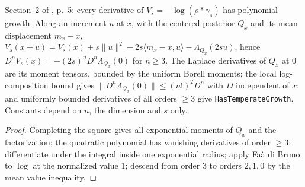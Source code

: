 \begin{lemma}
  \label{lem:bkl-gaussian-growth}
  \leanok
  Section~2 of \cite{BizeulKlartagLehec2026}, p.~5: every derivative of $V_s=-\log(\rho*\gamma_s)$
  has polynomial growth. Along an increment $u$ at $x$, with the centered posterior $Q_x$ and its
  mean displacement $m_x-x$, $V_s(x+u)=V_s(x)+s\|u\|^2-2s\langle m_x-x,u\rangle-\Lambda_{Q_x}(2su)$,
  hence $D^nV_s(x)=-(2s)^nD^n\Lambda_{Q_x}(0)$ for $n\ge3$. The Laplace derivatives of $Q_x$ at $0$
  are its moment tensors, bounded by the uniform Borell moments; the local log-composition bound
  gives $\|D^n\Lambda_{Q_x}(0)\|\le(n!)^2D^n$ with $D$ independent of $x$; and uniformly bounded
  derivatives of all orders $\ge3$ give \texttt{HasTemperateGrowth}. Constants depend on $n$, the
  dimension and $s$ only.
\end{lemma}
\begin{proof}
  \leanok
  Completing the square gives all exponential moments of $Q_x$ and the factorization; the
  quadratic polynomial has vanishing derivatives of order $\ge3$; differentiate under the integral
  inside one exponential radius; apply Faà di Bruno to $\log$ at the normalized value $1$; descend
  from order $3$ to orders $2,1,0$ by the mean value inequality.
\end{proof}

